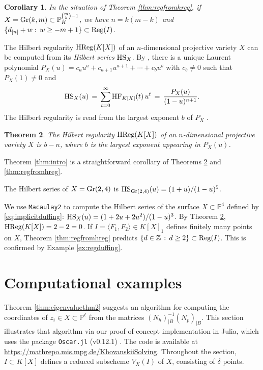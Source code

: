 \documentclass[12pt]{article}
\newtheorem{thm}{Theorem}[section]
\newtheorem{cor}[thm]{Corollary}
\theoremstyle{definition}
\newenvironment{example}
  {\pushQED{\qed}\renewcommand{\qedsymbol}{$\diamond$}\examplex}
  {\popQED\endexamplex}
\theoremstyle{remark}
\begin{document}
\begin{cor} \label{cor:grass}
    In the situation of Theorem \ref{thm:regfromhreg}, if $X = {\rm Gr}(k,m) \subset \mathbb{P}_K^{\binom{m}{k}-1}$, we have $n = k(m-k)$ and $\{ d_{[n]} + w :\, w \geq -m + 1\} \subset {\rm Reg}(I)$.
\end{cor}

The Hilbert regularity ${\rm HReg}(K[X])$ of an $n$-dimensional projective variety $X$ can be computed from its \emph{Hilbert series} ${\rm HS}_X$. By \cite[Corollary 4.1.8]{bruns1998cohen}, there is a unique Laurent polynomial $P_X(u) = c_a u^a + c_{a+1} u^{a+1} +  \cdots + c_b u^b$ with $c_b \neq 0$ such that $P_X(1) \neq 0$ and  
\[ {\rm HS}_X(u) \,= \, \sum_{t = 0}^\infty {\rm HF}_{K[X]}(t) \, u^t \, = \, \frac{P_X(u)}{(1-u)^{n+1}}. \]
The Hilbert regularity is read from the largest exponent $b$ of $P_X$ \cite[Proposition 4.1.12]{bruns1998cohen}.
\begin{thm} \label{thm:brunsherzog}
    The Hilbert regularity ${\rm HReg}(K[X])$ of an $n$-dimensional projective variety $X$ is $b - n$, where $b$ is the largest exponent appearing in $P_X(u)$.
\end{thm}
Theorem \ref{thm:intro} is a straightforward corollary of Theorems \ref{thm:brunsherzog} and \ref{thm:regfromhreg}.

\begin{example}
    The Hilbert series of $X = {\rm Gr}(2,4)$ is ${\rm HS}_{{\rm Gr}(2,4)}(u) = (1 + u)/(1-u)^5$. 
\end{example}

\begin{example} \label{ex:hregduffing}
    We use \texttt{Macaulay2} to compute the Hilbert series of the surface $X\subset \mathbb{P}^4$ defined by \eqref{eq:implicitduffing}: ${\rm HS}_X(u) = (1+2u+2u^2)/(1-u)^3$. By Theorem \ref{thm:brunsherzog}, ${\rm HReg}(K[X]) = 2 - 2 = 0$. If $I = \langle F_1, F_2 \rangle \in K[X]_1$ defines finitely many points on $X$, Theorem \ref{thm:regfromhreg} predicts $\{ d \in \mathbb{Z} \, : \, d \geq 2 \} \subset {\rm Reg}(I)$. This is confirmed by Example \ref{ex:regduffing}. 
\end{example}



\section{Computational examples} \label{sec:6}

Theorem \ref{thm:eigenvaluethm2} suggests an algorithm for computing the coordinates of $z_i \in X \subset \mathbb{P}^\ell$ from the matrices $(N_h)_{|B}^{-1} (N_p)_{|B}$. This section illustrates that algorithm via our proof-of-concept implementation in Julia, which uses the package \texttt{Oscar.jl} (v0.12.1) \cite{OSCAR}. The code is available at \url{https://mathrepo.mis.mpg.de/KhovanskiiSolving}. Throughout the section, $I \subset K[X]$ defines a reduced subscheme $V_X(I)$ of $X$, consisting of $\delta$ points.
\end{document}
